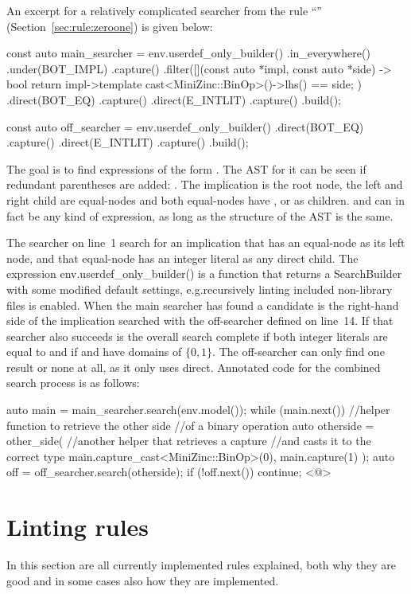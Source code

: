 \documentclass[a4paper,12pt]{article}
\newcommand{\mi}[1]{\mbox{\mzninline{#1}}}
\newcommand{\cpp}[1]{\mbox{\mznfont #1}}
\newcommand{\ruleref}[1]{``\nameref{sec:rule:#1}'' (Section~\ref{sec:rule:#1})}
\begin{document}
An excerpt for a relatively complicated searcher from the rule \ruleref{zeroone} is given
below:
\begin{cppp}
const auto main_searcher = env.userdef_only_builder()
  .in_everywhere()
  .under(BOT_IMPL)
  .capture()
  .filter([](const auto *impl, const auto *side) -> bool {
    return impl->template cast<MiniZinc::BinOp>()->lhs() == side;
  })
  .direct(BOT_EQ)
  .capture()
  .direct(E_INTLIT)
  .capture()
  .build();

const auto off_searcher = env.userdef_only_builder()
  .direct(BOT_EQ)
  .capture()
  .direct(E_INTLIT)
  .capture()
  .build();
\end{cppp}

The goal is to find expressions of the form \mi{a=1 -> b=1}.
The AST for it can be seen if redundant parentheses are added: \mi{((a)=(1)) -> ((b)=(1))}.
The implication is the root node, the left and right child are equal-nodes and both
equal-nodes have \mi{a}, \mi{b} or \mi{1} as children. \mi{a} and \mi{b} can in fact be
any kind of expression, as long as the structure of the AST is the same.

The searcher on line~1 search for an implication that has an equal-node as its left node,
and that equal-node has an integer literal as any direct child. The expression
\cpp{env.userdef\_only\_builder()} is a function that returns a \cpp{SearchBuilder} with some
modified default settings, e.g.\@ recursively linting included non-library files is enabled.
When the main searcher has found a candidate is the right-hand side of the implication
searched with the off-searcher defined on line~14. If that searcher also succeeds is the
overall search complete if both integer literals are equal to \mi{1} and if \mi{a} and
\mi{b} have domains of $\{0,1\}$. The off-searcher can only find one result or none at
all, as it only uses \cpp{direct}. Annotated code for the combined search process is as follows:
\begin{cppp}
auto main = main_searcher.search(env.model());
while (main.next()) {
  //helper function to retrieve the other side
  //of a binary operation
  auto otherside = other_side(
    //another helper that retrieves a capture
    //and casts it to the correct type
    main.capture_cast<MiniZinc::BinOp>(0),
    main.capture(1)
    );
  auto off = off_searcher.search(otherside);
  if (!off.next())
    continue;
  <@\vdots@>
}
\end{cppp}

\section{Linting rules}\label{sec:rules}
In this section are all currently implemented rules explained, both why they are good
and in some cases also how they are implemented.
\end{document}

